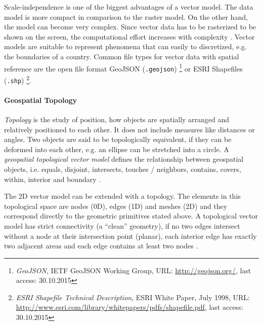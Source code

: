 Scale-independence is one of the biggest advantages of a vector model. The data model is more compact in comparison to the raster model. On the other hand, the model can become very complex. Since vector data has to be rasterized to be shown on the screen, the computational effort increases with complexity \cite[pp.33-42]{bolstad2008gis}.
Vector models are suitable to represent phenomena that can easily to discretized, e.g. the boundaries of a country. Common file types for vector data with spatial reference are the open file format GeoJSON (\texttt{.geojson})
\footnote{
  \emph{GeoJSON},
  IETF GeoJSON Working Group,
  URL: \url{http://geojson.org/},
  last access: 30.10.2015
}
or ESRI Shapefiles (\texttt{.shp})
\footnote{
  \emph{ESRI Shapefile Technical Description},
  ESRI White Paper, July 1998,
  URL: \url{http://www.esri.com/library/whitepapers/pdfs/shapefile.pdf},
  last access: 30.10.2015
}.


\paragraph{Geospatial Topology} %
\label{par:geospatial_topology}

\emph{Topology} is the study of position, how objects are spatially arranged and relatively positioned to each other. It does not include measures like distances or angles. Two objects are said to be topologically equivalent, if they can be deformed into each other, e.g. an ellipse can be stretched into a circle. A \emph{geospatial topological vector model} defines the relationship between geospatial objects, i.e. equals, disjoint, intersects, touches / neighbors, contains, covers, within, interior and boundary
\cite{clementiniTopology}.

The 2D vector model can be extended with a topology. The elements in this topological space are nodes (0D), edges (1D) and meshes (2D) and they correspond directly to the geometric primitives stated above. A topological vector model has strict connectivity (a ``clean'' geometry), if no two edges intersect without a node at their intersection point (planar), each interior edge has exactly two adjacent areas and each edge contains at least two nodes
\cite[pp.37-39]{bolstad2008gis}.

